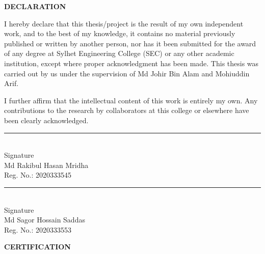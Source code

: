 \documentclass[12pt,a4paper]{article}
\begin{document}
\newpage
{}
{}

\begin{center}
    \textbf{\Large DECLARATION}
\end{center}

\vspace{3\baselineskip}

\noindent I hereby declare that this thesis/project is the result of my own independent work, and to the best of my knowledge, it contains no material previously published or written by another person, nor has it been submitted for the award of any degree at Sylhet Engineering College (SEC) or any other academic institution, except where proper acknowledgment has been made. This thesis was carried out by us under the supervision of Md Johir Bin Alam and Mohiuddin Arif.

I further affirm that the intellectual content of this work is entirely my own. Any contributions to the research by collaborators at this college or elsewhere have been clearly acknowledged.

\vspace{2cm}

\noindent
\begin{minipage}[t]{0.45\textwidth}
    \rule{0.8\textwidth}{0.5pt}\\
    Signature\\[0.5cm]
    Md Rakibul Hasan Mridha\\
    Reg. No.: 2020333545
\end{minipage}
\hfill
\begin{minipage}[t]{0.45\textwidth}
    \rule{0.8\textwidth}{0.5pt}\\
    Signature\\[0.5cm]
    Md Sagor Hossain Saddas\\
    Reg. No.: 2020333553
\end{minipage}

\newpage
{}
{}

\begin{center}
    \textbf{\Large CERTIFICATION}
\end{center}

\vspace{2\baselineskip}
\end{document}

